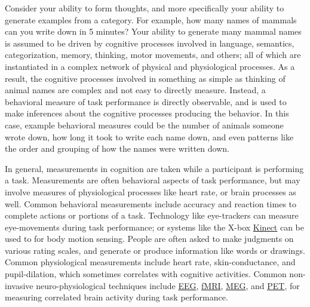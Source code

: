 \documentclass[
  oneside,
  12pt]{crumpbook}
\begin{document}
Consider your ability to form thoughts, and more specifically your ability to generate examples from a category. For example, how many names of mammals can you write down in 5 minutes? Your ability to generate many mammal names is assumed to be driven by cognitive processes involved in language, semantics, categorization, memory, thinking, motor movements, and others; all of which are instantiated in a complex network of physical and physiological processes. As a result, the cognitive processes involved in something as simple as thinking of animal names are complex and not easy to directly measure. Instead, a behavioral measure of task performance is directly observable, and is used to make inferences about the cognitive processes producing the behavior. In this case, example behavioral measures could be the number of animals someone wrote down, how long it took to write each name down, and even patterns like the order and grouping of how the names were written down.

In general, measurements in cognition are taken while a participant is performing a task. Measurements are often behavioral aspects of task performance, but may involve measures of physiological processes like heart rate, or brain processes as well. Common behavioral measurements include accuracy and reaction times to complete actions or portions of a task. Technology like eye-trackers can measure eye-movements during task performance; or systems like the X-box \href{https://en.wikipedia.org/wiki/Kinect}{Kinect} can be used to for body motion sensing. People are often asked to make judgments on various rating scales, and generate or produce information like words or drawings. Common physiological measurements include heart rate, skin-conductance, and pupil-dilation, which sometimes correlates with cognitive activities. Common non-invasive neuro-physiological techniques include \href{https://en.wikipedia.org/wiki/Electroencephalography}{EEG}, \href{https://en.wikipedia.org/wiki/Functional_magnetic_resonance_imaging}{fMRI}, \href{https://en.wikipedia.org/wiki/Magnetoencephalography}{MEG}, and \href{https://en.wikipedia.org/wiki/Positron_emission_tomography}{PET}, for measuring correlated brain activity during task performance.
\end{document}
